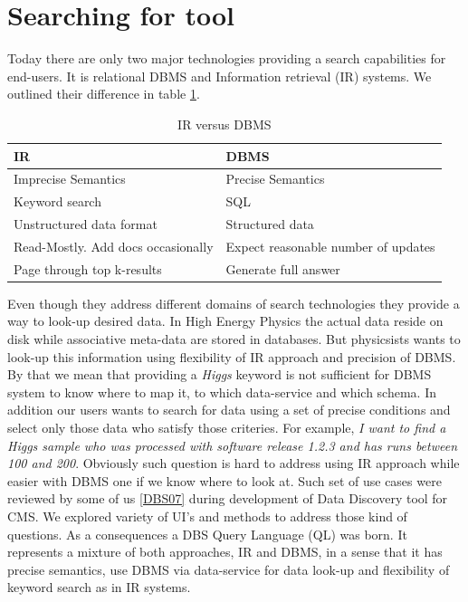 \documentclass[a4paper]{jpconf}
\begin{document}
\section{Searching for tool}
Today there are only two major technologies providing a search capabilities
for end-users. It is relational DBMS and Information retrieval (IR) systems.
We outlined their difference in table \ref{IR_DBMS}.

\begin{table}[hbt]
\centering
\begin{tabular}{ll}\hline\hline

IR & DBMS \\
\hline
Imprecise Semantics & Precise Semantics \\
Keyword search & SQL \\
Unstructured data format & Structured data \\
Read-Mostly.  Add docs occasionally & Expect reasonable number of updates \\
Page through top k-results & Generate full answer \\
\hline
\end{tabular}
\caption{IR versus DBMS}
\label{IR_DBMS}
\end{table}

Even though they address different domains of search technologies they
provide a way to look-up desired data. In High Energy Physics the actual data
reside on disk while associative meta-data are stored in databases.
But physicsists wants to look-up this information using flexibility of
IR approach and precision of DBMS. By that we mean that providing a {\it Higgs}
keyword is not sufficient for DBMS system to know where to map it,
to which data-service and which schema. In addition our users wants
to search for data using a set of precise conditions and select only those
data who satisfy those criteries. For example,
{\it I want to find a Higgs sample who was processed with software release
1.2.3 and has runs between 100 and 200}. Obviously such question is
hard to address using IR approach while easier with DBMS one if we know
where to look at. Such set of use cases were reviewed by some of us
\ref{DBS07} during development of Data Discovery tool for CMS. We explored
variety of UI's and methods to address those kind of questions. As a
consequences a DBS Query Language (QL) was born. It represents a mixture
of both approaches, IR and DBMS, in a sense that it has precise
semantics, use DBMS via data-service for data look-up and flexibility of
keyword search as in IR systems.
\end{document}
